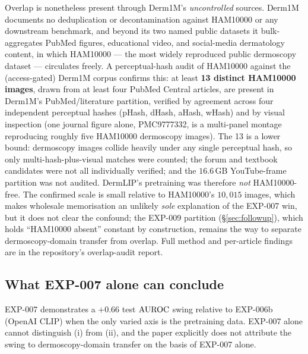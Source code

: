 Overlap is nonetheless present through Derm1M's \emph{uncontrolled} sources.
Derm1M documents no deduplication or decontamination against HAM10000 or any
downstream benchmark, and beyond its two named public datasets it
bulk-aggregates PubMed figures, educational video, and social-media
dermatology content, in which HAM10000 --- the most widely reproduced public
dermoscopy dataset --- circulates freely. A perceptual-hash audit of HAM10000
against the (access-gated) Derm1M corpus confirms this: at least
\textbf{13 distinct HAM10000 images}, drawn from at least four PubMed Central
articles, are present in Derm1M's PubMed/literature partition, verified by
agreement across four independent perceptual hashes (pHash, dHash, aHash,
wHash) and by visual inspection (one journal figure alone, PMC9777332, is a
multi-panel montage reproducing roughly five HAM10000 dermoscopy images). The
13 is a lower bound: dermoscopy images collide heavily under any single
perceptual hash, so only multi-hash-plus-visual matches were counted; the
forum and textbook candidates were not all individually verified; and the
$16.6$\,GB YouTube-frame partition was not audited. DermLIP's pretraining was
therefore \emph{not} HAM10000-free. The confirmed scale is small relative to
HAM10000's $10{,}015$ images, which makes wholesale memorisation an unlikely
\emph{sole} explanation of the EXP-007 win, but it does not clear the
confound; the EXP-009 partition (\S\ref{sec:followup}), which holds
``HAM10000 absent'' constant by construction, remains the way to separate
dermoscopy-domain transfer from overlap. Full method and per-article findings
are in the repository's overlap-audit report.

\subsection{What EXP-007 alone can conclude}
EXP-007 demonstrates a $+0.66$ test $\mathrm{AUROC}$ swing relative to
EXP-006b (OpenAI CLIP) when the only varied axis is the pretraining
data. EXP-007 alone cannot distinguish (i) from (ii), and the paper
explicitly does not attribute the swing to dermoscopy-domain transfer
on the basis of EXP-007 alone.


